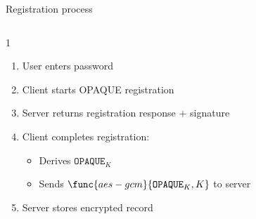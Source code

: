 \ifdefined\PRESENTATION\else\PassOptionsToClass{handout}{beamer}\fi\documentclass[aspectratio=169, lualatex]{beamer}
\begin{document}
\begin{frame}{Registration process}
	\begin{columns}[c]
		\begin{column}{1\textwidth}
			\begin{enumerate}
				\item User enters password
				\item Client starts OPAQUE registration
				\item Server returns registration response + signature
				\item Client completes registration:
				      \begin{itemize}
					      \item Derives $\mathtt{OPAQUE}_K$
					      \item Sends $\func{aes-gcm}{\mathtt{OPAQUE}_K, K}$ to server
				      \end{itemize}
				\item Server stores encrypted record
			\end{enumerate}
		\end{column}
	\end{columns}
\end{frame}
\end{document}
